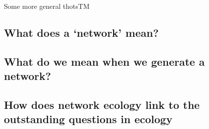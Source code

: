 \documentclass[
]{agujournal2019}
\begin{document}
Some more general thotsTM

\subsection{What does a `network' mean?}\label{what-does-a-network-mean}

\subsection{What do we mean when we generate a
network?}\label{what-do-we-mean-when-we-generate-a-network}

\subsection{How does network ecology link to the outstanding questions
in
ecology}\label{how-does-network-ecology-link-to-the-outstanding-questions-in-ecology}
\end{document}
